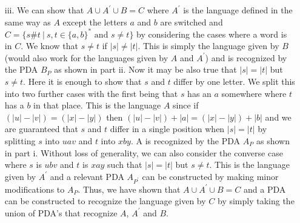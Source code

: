 \documentclass [10pt]{article}
\begin{document}
\begin{enumerate}
\begin{enumerate}
		\item[iii.]We can show that $A\cup A^{\prime}\cup B = C$ where $A^{\prime}$ is the language defined in the same way as $A$ except the letters $a$ and $b$ are switched and $C = \{s\#t\:|\:s,t\in\{a,b\}^{*} \text{ and } s\ne t\}$ by considering the cases where a word is in $C$. We know that $s \ne t$ if $\left|s\right| \ne \left|t\right|$. This is simply the language given by $B$ (would also work for the languages given by $A$ and $A^{\prime}$) and is recognized by the PDA $B_{P}$ as shown in part ii. Now it may be also true that $\left|s\right| = \left|t\right|$ but $s \ne t$. Here it is enough to show that $s$ and $t$ differ by one letter. We split this into two further cases with the first being that $s$ has an $a$ somewhere where $t$ has a $b$ in that place. This is the language $A$ since if $(\left|u\right| - \left|v\right|) = (\left|x\right| - \left|y\right|)$ then $(\left|u\right| - \left|v\right|) + \left|a\right| = (\left|x\right| - \left|y\right|) + \left|b\right|$ and we are guaranteed that $s$ and $t$ differ in a single position when $\left|s\right| = \left|t\right|$ by splitting $s$ into $uav$ and $t$ into $xby$. A is recognized by the PDA $A_{P}$ as shown in part i. Without loss of generality, we can also consider the converse case where $s$ is $ubv$ and $t$ is $xay$ such that $\left|s\right| = \left|t\right|$ but $s \ne t$. This is the language given by $A^{\prime}$ and a relevant PDA $A_{P^{\prime}}$ can be constructed by making minor modifications to $A_{P}$. Thus, we have shown that $A\cup A^{\prime}\cup B = C$ and a PDA can be constructed to recognize the language given by $C$ by simply taking the union of PDA's that recognize $A$, $A^{\prime}$ and $B$.
	\end{enumerate}

\end{enumerate}
\end{document}
